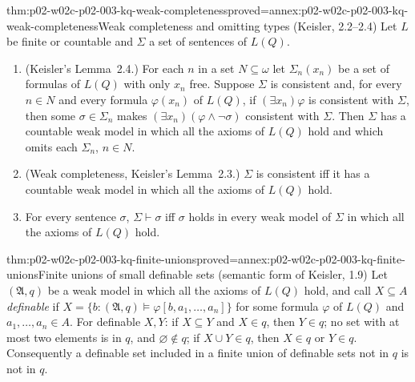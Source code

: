 \begin{hbtheorem}{thm:p02-w02c-p02-003-kq-weak-completeness}{proved=annex:p02-w02c-p02-003-kq-weak-completeness}{Weak completeness and omitting types (Keisler, 2.2--2.4)}
Let \(L\) be finite or countable and \(\Sigma\) a set of sentences of
\(L(Q)\).
\begin{enumerate}
\item (Keisler's Lemma~2.4.)  For each \(n\) in a set \(N\subseteq\omega\)
      let \(\Sigma_n(x_n)\) be a set of formulas of \(L(Q)\) with only \(x_n\)
      free.  Suppose \(\Sigma\) is consistent and, for every \(n\in N\) and
      every formula \(\varphi(x_n)\) of \(L(Q)\), if \((\exists x_n)\varphi\)
      is consistent with \(\Sigma\), then some \(\sigma\in\Sigma_n\) makes
      \((\exists x_n)(\varphi\land\neg\sigma)\) consistent with \(\Sigma\).
      Then \(\Sigma\) has a countable weak model in which all the axioms of
      \(L(Q)\) hold and which omits each \(\Sigma_n\), \(n\in N\).
\item (Weak completeness, Keisler's Lemma~2.3.)  \(\Sigma\) is consistent
      iff it has a countable weak model in which all the axioms of
      \(L(Q)\) hold.
\item For every sentence \(\sigma\), \(\Sigma\vdash\sigma\) iff \(\sigma\)
      holds in every weak model of \(\Sigma\) in which all the axioms of
      \(L(Q)\) hold.
\end{enumerate}
\end{hbtheorem}

\begin{hblemma}{thm:p02-w02c-p02-003-kq-finite-unions}{proved=annex:p02-w02c-p02-003-kq-finite-unions}{Finite unions of small definable sets (semantic form of Keisler, 1.9)}
Let \((\mathfrak A,q)\) be a weak model in which all the axioms of \(L(Q)\)
hold, and call \(X\subseteq A\) \emph{definable} if
\(X=\{b:(\mathfrak A,q)\models\varphi[b,a_1,\ldots,a_n]\}\) for some
formula \(\varphi\) of \(L(Q)\) and \(a_1,\ldots,a_n\in A\).  For definable
\(X,Y\): if \(X\subseteq Y\) and \(X\in q\), then \(Y\in q\); no set with at
most two elements is in \(q\), and \(\varnothing\notin q\); if
\(X\cup Y\in q\), then \(X\in q\) or \(Y\in q\).  Consequently a definable
set included in a finite union of definable sets not in \(q\) is not in
\(q\).
\end{hblemma}

